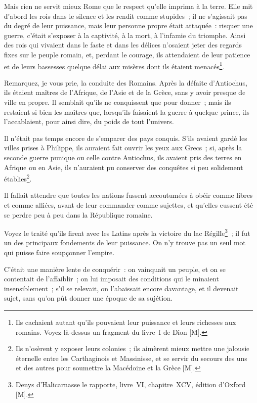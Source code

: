 \documentclass[french,twoside]{book} %
\begin{document}
Mais rien ne servit mieux Rome que le respect qu’elle imprima à la terre. Elle mit d’abord les rois dans le silence et les rendit comme stupides ; il ne s’agissait pas du degré de leur puissance, mais leur personne propre était attaquée : risquer une guerre, c’était s’exposer à la captivité, à la mort, à l’infamie du triomphe. Ainsi des rois qui vivaient dans le faste et dans les délices n’osaient jeter des regards fixes sur le peuple romain, et, perdant le courage, ils attendaient de leur patience et de leurs bassesses quelque délai aux misères dont ils étaient menacés\footnote{Ils cachaient autant qu’ils pouvaient leur puissance et leurs richesses aux romains. Voyez là-dessus un fragment du livre I de Dion [M].}.\par
Remarquez, je vous prie, la conduite des Romains. Après la défaite d’Antiochus, ils étaient maîtres de l’Afrique, de l’Asie et de la Grèce, sans y avoir presque de ville en propre. Il semblait qu’ils ne conquissent que pour donner ; mais ils restaient si bien les maîtres que, lorsqu’ils faisaient la guerre à quelque prince, ils l’accablaient, pour ainsi dire, du poids de tout l’univers.\par
Il n’était pas temps encore de s’emparer des pays conquis. S’ils avaient gardé les villes prises à Philippe, ils auraient fait ouvrir les yeux aux Grecs ; si, après la seconde guerre punique ou celle contre Antiochus, ils avaient pris des terres en Afrique ou en Asie, ils n’auraient pu conserver des conquêtes si peu solidement établies\footnote{Ils n’osèrent y exposer leurs colonies ; ils aimèrent mieux mettre une jalousie éternelle entre les Carthaginois et Massinisse, et se servir du secours des uns et des autres pour soumettre la Macédoine et la Grèce [M].}.\par
Il fallait attendre que toutes les nations fussent accoutumées à obéir comme libres et comme alliées, avant de leur commander comme sujettes, et qu’elles eussent été se perdre peu à peu dans la République romaine.\par
Voyez le traité qu’ils firent avec les Latins après la victoire du lac Régille\footnote{Denys d’Halicarnasse le rapporte, livre VI, chapitre XCV, édition d’Oxford [M].} ; il fut un des principaux fondements de leur puissance. On n’y trouve pas un seul mot qui puisse faire soupçonner l’empire.\par
C’était une manière lente de conquérir : on vainquait un peuple, et on se contentait de l’affaiblir ; on lui imposait des conditions qui le minaient insensiblement ; s’il se relevait, on l’abaissait encore davantage, et il devenait sujet, sans qu’on pût donner une époque de sa sujétion.\par
\end{document}
